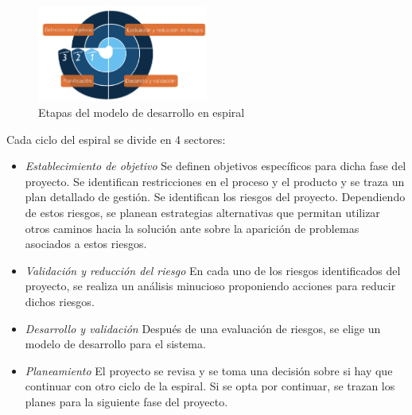 \begin{figure}[h!]
 \begin{center}
  \includegraphics[width=0.5\textwidth,keepaspectratio=true]{./images/ESPIRAL}
  \caption{Etapas del modelo de desarrollo en espiral}
  \label{fig:esquema}
 \end{center}
\end{figure}

\vspace{0.5cm}
\par
Cada ciclo del espiral se divide en 4 sectores:
\begin {itemize}
\item 
\textit{Establecimiento de objetivo} Se definen objetivos específicos para dicha fase del proyecto. Se identifican restricciones en el proceso y el
producto y se traza un plan detallado de gestión. Se identifican los riesgos del proyecto. Dependiendo de estos riesgos, se planean estrategias
alternativas que permitan utilizar otros caminos hacia la solución ante sobre la aparición de problemas asociados a estos riesgos.
\item 
\textit{Validación y reducción del riesgo} En cada uno de los riesgos identificados del proyecto, se realiza un análisis minucioso proponiendo
acciones para reducir dichos riesgos.
\item 
\textit{Desarrollo y validación} Después de una evaluación de riesgos, se elige un modelo de desarrollo para el sistema.
\item 
\textit{Planeamiento}  El proyecto se revisa y se toma una decisión sobre si hay que continuar con otro ciclo de la espiral. Si se opta por continuar,
se trazan los planes para la siguiente fase del proyecto.
\end {itemize}

